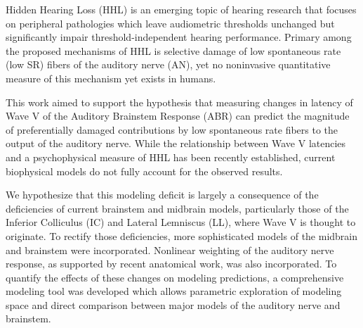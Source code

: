 Hidden Hearing Loss (HHL) is an emerging topic of hearing research that focuses on peripheral pathologies which leave audiometric thresholds unchanged but significantly impair threshold-independent hearing performance. Primary among the proposed mechanisms of HHL is selective damage of low spontaneous rate (low SR) fibers of the auditory nerve (AN), yet no noninvasive quantitative measure of this mechanism yet exists in humans.

This work aimed to support the hypothesis that measuring changes in latency of Wave V of the Auditory Brainstem Response (ABR) can predict the magnitude of preferentially damaged contributions by low spontaneous rate fibers to the output of the auditory nerve. While the relationship between Wave V latencies and a psychophysical measure of HHL has been recently established, current biophysical models do not fully account for the observed results.

We hypothesize that this modeling deficit is largely a consequence of the deficiencies of current brainstem and midbrain models, particularly those of the Inferior Colliculus (IC) and Lateral Lemniscus (LL), where Wave V is thought to originate.  To rectify those deficiencies, more sophisticated models of the midbrain and brainstem were incorporated.  Nonlinear weighting of the auditory nerve response, as supported by recent anatomical work, was also incorporated.  To quantify the effects of these changes on modeling predictions, a comprehensive modeling tool was developed which allows parametric exploration of modeling space and direct comparison between major models of the auditory nerve and brainstem. 